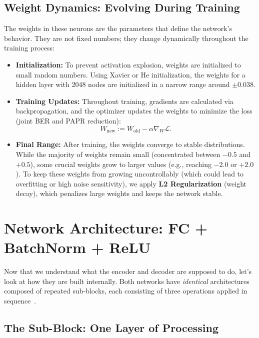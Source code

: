 \subsection{Weight Dynamics: Evolving During Training}
The weights in these neurons are the parameters that define the network's behavior. They are not fixed numbers; they change dynamically throughout the training process:
\begin{itemize}
    \item \textbf{Initialization:} To prevent activation explosion, weights are initialized to small random numbers. Using Xavier or He initialization, the weights for a hidden layer with 2048 nodes are initialized in a narrow range around $\pm 0.038$.
    \item \textbf{Training Updates:} Throughout training, gradients are calculated via backpropagation, and the optimizer updates the weights to minimize the loss (joint BER and PAPR reduction):
      \begin{equation*}
          W_{\mathrm{new}} := W_{\mathrm{old}} - \alpha \nabla_{W} \mathcal{L}.
      \end{equation*}
    \item \textbf{Final Range:} After training, the weights converge to stable distributions. While the majority of weights remain small (concentrated between $-0.5$ and $+0.5$), some crucial weights grow to larger values (e.g., reaching $-2.0$ or $+2.0$). To keep these weights from growing uncontrollably (which could lead to overfitting or high noise sensitivity), we apply \textbf{L2 Regularization} (weight decay), which penalizes large weights and keeps the network stable.
\end{itemize}


\section{Network Architecture: FC + BatchNorm + ReLU}

Now that we understand what the encoder and decoder are supposed to do, let's look at how they are built internally. Both networks have \emph{identical} architectures composed of repeated sub-blocks, each consisting of three operations applied in sequence~\cite{kim2017novel}.

\subsection{The Sub-Block: One Layer of Processing}


